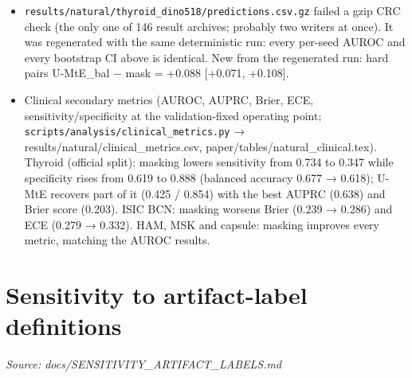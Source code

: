 {\begin{itemize}

\item
  \texttt{results/natural/thyroid\_dino518/predictions.csv.gz} failed a gzip CRC check (the only one of 146 result archives;
  probably two writers at once). It was regenerated with the same deterministic run: every per-seed AUROC and every
  bootstrap CI above is identical. New from the regenerated run: hard pairs U-MtE\_bal − mask = +0.088 {[}+0.071, +0.108{]}.
\item
  Clinical secondary metrics (AUROC, AUPRC, Brier, ECE, sensitivity/specificity at the validation-fixed operating point;
  \texttt{scripts/analysis/clinical\_metrics.py} → results/natural/clinical\_metrics.csv, paper/tables/natural\_clinical.tex).
  Thyroid (official split): masking lowers sensitivity from 0.734 to 0.347 while specificity rises from 0.619 to 0.888
  (balanced accuracy 0.677 → 0.618); U-MtE recovers part of it (0.425 / 0.854) with the best AUPRC (0.638) and Brier
  score (0.203). ISIC BCN: masking worsens Brier (0.239 → 0.286) and ECE (0.279 → 0.332). HAM, MSK and capsule: masking
  improves every metric, matching the AUROC results.
\end{itemize}

}

\section{Sensitivity to artifact-label definitions}\label{doc:SENSITIVITY_ARTIFACT_LABELS}
\noindent\textit{Source: docs/SENSITIVITY\_ARTIFACT\_LABELS.md}

